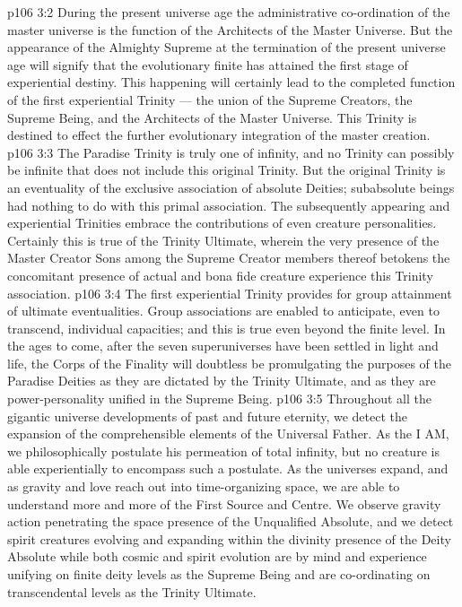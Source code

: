 \vs p106 3:2 During the present universe age the administrative co\hyp{}ordination of the master universe is the function of the Architects of the Master Universe. But the appearance of the Almighty Supreme at the termination of the present universe age will signify that the evolutionary finite has attained the first stage of experiential destiny. This happening will certainly lead to the completed function of the first experiential Trinity --- the union of the Supreme Creators, the Supreme Being, and the Architects of the Master Universe. This Trinity is destined to effect the further evolutionary integration of the master creation.
\vs p106 3:3 The Paradise Trinity is truly one of infinity, and no Trinity can possibly be infinite that does not include this original Trinity. But the original Trinity is an eventuality of the exclusive association of absolute Deities; subabsolute beings had nothing to do with this primal association. The subsequently appearing and experiential Trinities embrace the contributions of even creature personalities. Certainly this is true of the Trinity Ultimate, wherein the very presence of the Master Creator Sons among the Supreme Creator members thereof betokens the concomitant presence of actual and bona fide creature experience  this Trinity association.
\vs p106 3:4 The first experiential Trinity provides for group attainment of ultimate eventualities. Group associations are enabled to anticipate, even to transcend, individual capacities; and this is true even beyond the finite level. In the ages to come, after the seven superuniverses have been settled in light and life, the Corps of the Finality will doubtless be promulgating the purposes of the Paradise Deities as they are dictated by the Trinity Ultimate, and as they are power\hyp{}personality unified in the Supreme Being.
\vs p106 3:5 \pc Throughout all the gigantic universe developments of past and future eternity, we detect the expansion of the comprehensible elements of the Universal Father. As the I AM, we philosophically postulate his permeation of total infinity, but no creature is able experientially to encompass such a postulate. As the universes expand, and as gravity and love reach out into time\hyp{}organizing space, we are able to understand more and more of the First Source and Centre. We observe gravity action penetrating the space presence of the Unqualified Absolute, and we detect spirit creatures evolving and expanding within the divinity presence of the Deity Absolute while both cosmic and spirit evolution are by mind and experience unifying on finite deity levels as the Supreme Being and are co\hyp{}ordinating on transcendental levels as the Trinity Ultimate.
